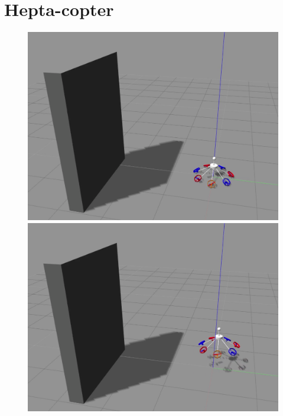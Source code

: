 \clearpage

\section{Hepta-copter}
\label{sec:hepta_copter_sim}

\begin{figure}[!ht]
    \begin{center}
    \begin{minipage}[t]{0.495\textwidth}
      \includegraphics[width=\linewidth]{images/Selection_009.png}
    \end{minipage}
    \hfill
    \begin{minipage}[t]{0.495\textwidth}
      \includegraphics[width=\linewidth]{images/Selection_010.png}

\end{minipage}
\end{center}
\end{figure}
